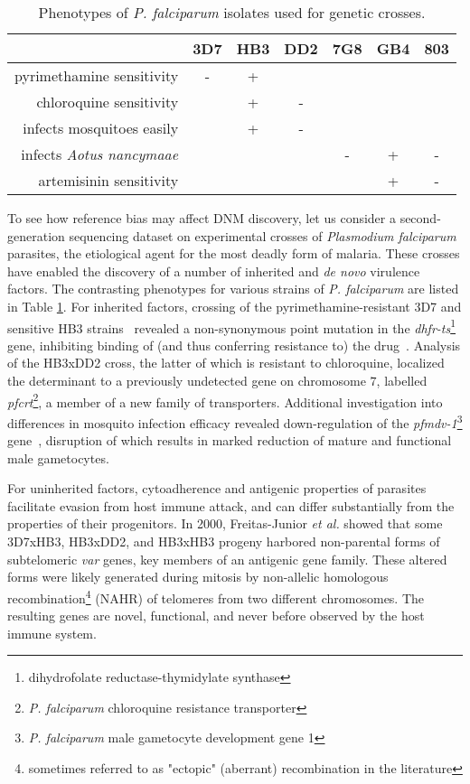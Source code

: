 \begin{table}[]
\centering
\caption{Phenotypes of \textit{P. falciparum} isolates used for genetic crosses.}
\label{tb:pf_phenotypes}
\begin{tabular}{@{}rcccccc@{}}
\toprule
                                 & 3D7 & HB3 & DD2 & 7G8 & GB4 & 803 \\
\midrule
pyrimethamine sensitivity        & -   & +   &     &     &     &     \\
chloroquine sensitivity          &     & +   & -   &     &     &     \\
infects mosquitoes easily        &     & +   & -   &     &     &     \\
infects \textit{Aotus nancymaae} &     &     &     & -   & +   & -   \\
artemisinin sensitivity          &     &     &     &     & +   & -   \\
\bottomrule
\end{tabular}
\end{table}

To see how reference bias may affect DNM discovery, let us consider a second-generation sequencing dataset on experimental crosses of \textit{Plasmodium falciparum} parasites, the etiological agent for the most deadly form of malaria.  These crosses have enabled the discovery of a number of inherited and \textit{de novo} virulence factors.  The contrasting phenotypes for various strains of \textit{P. falciparum} are listed in Table \ref{tb:pf_phenotypes}.  For inherited factors, crossing of the pyrimethamine-resistant 3D7 and sensitive HB3 strains~\cite{Walliker:1987cv} revealed a non-synonymous point mutation in the \textit{dhfr-ts}\footnote{dihydrofolate reductase-thymidylate synthase} gene, inhibiting binding of (and thus conferring resistance to) the drug~\cite{Peterson:1988wt}.  Analysis of the HB3xDD2 cross\cite{Wellems:1990eg}, the latter of which is resistant to chloroquine, localized the determinant to a previously undetected gene on chromosome $7$, labelled \textit{pfcrt}\footnote{\textit{P. falciparum} chloroquine resistance transporter}, a member of a new family of transporters.  Additional investigation into differences in mosquito infection efficacy revealed down-regulation of the \textit{pfmdv-1}\footnote{\textit{P. falciparum} male gametocyte development gene 1} gene~\cite{Vaidya:1995up,Furuya:2005jn}, disruption of which results in marked reduction of mature and functional male gametocytes.

For uninherited factors, cytoadherence and antigenic properties of parasites facilitate evasion from host immune attack, and can differ substantially from the properties of their progenitors.  In 2000, Freitas-Junior \textit{et al.} showed that some 3D7xHB3, HB3xDD2, and HB3xHB3 progeny harbored non-parental forms of subtelomeric \textit{var} genes, key members of an antigenic gene family\cite{FreitasJunior:2000cp}.  These altered forms were likely generated during mitosis by non-allelic homologous recombination\footnote{sometimes referred to as "ectopic" (aberrant) recombination in the literature} (NAHR) of telomeres from two different chromosomes\cite{Duffy:2009cc}.  The resulting genes are novel, functional, and never before observed by the host immune system.

